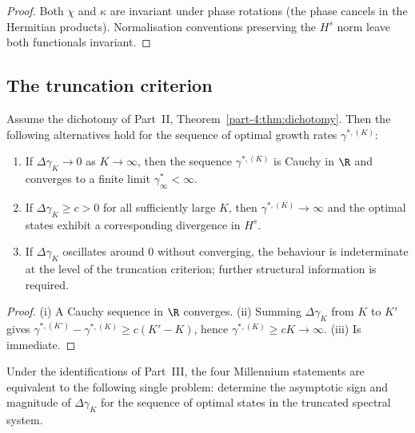 \begin{proof}
Both $\chi$ and $\kappa$ are invariant under phase rotations (the 
phase cancels in the Hermitian products). Normalisation conventions 
preserving the $H^s$ norm leave both functionals invariant.
\end{proof}

\subsection{The truncation criterion}
\label{part-4:ssec:criterion}

\begin{theorem}\label{part-4:thm:criterion}
Assume the dichotomy of Part~II, Theorem~\ref{part-4:thm:dichotomy}. Then 
the following alternatives hold for the sequence of optimal 
growth rates $\gamma^{\ast,(K)}$:
\begin{enumerate}[label=(\roman*),leftmargin=*]
\item If $\Delta\gamma_K\to 0$ as $K\to\infty$, then the sequence 
      $\gamma^{\ast,(K)}$ is Cauchy in $\R$ and converges to a finite 
      limit $\gamma^\ast_\infty<\infty$.
\item If $\Delta\gamma_K\geq c>0$ for all sufficiently large $K$, 
      then $\gamma^{\ast,(K)}\to\infty$ and the optimal states 
      exhibit a corresponding divergence in $H^s$.
\item If $\Delta\gamma_K$ oscillates around $0$ without converging, 
      the behaviour is indeterminate at the level of the truncation 
      criterion; further structural information is required.
\end{enumerate}
\end{theorem}

\begin{proof}
(i) A Cauchy sequence in $\R$ converges. (ii) Summing $\Delta\gamma_K$ 
from $K$ to $K'$ gives $\gamma^{\ast,(K')}-\gamma^{\ast,(K)}\geq 
c(K'-K)$, hence $\gamma^{\ast,(K)}\geq cK\to\infty$. (iii) Is 
immediate.
\end{proof}

\begin{corollary}\label{part-4:cor:four-via-increment}
Under the identifications of Part~III, the four Millennium 
statements are equivalent to the following single problem: determine 
the asymptotic sign and magnitude of $\Delta\gamma_K$ for the 
sequence of optimal states in the truncated spectral system.
\end{corollary}

